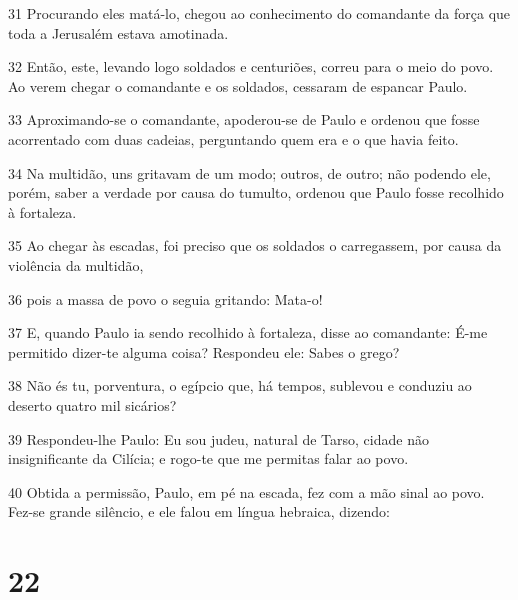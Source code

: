 \par 31 Procurando eles matá-lo, chegou ao conhecimento do comandante da força que toda a Jerusalém estava amotinada.
\par 32 Então, este, levando logo soldados e centuriões, correu para o meio do povo. Ao verem chegar o comandante e os soldados, cessaram de espancar Paulo.
\par 33 Aproximando-se o comandante, apoderou-se de Paulo e ordenou que fosse acorrentado com duas cadeias, perguntando quem era e o que havia feito.
\par 34 Na multidão, uns gritavam de um modo; outros, de outro; não podendo ele, porém, saber a verdade por causa do tumulto, ordenou que Paulo fosse recolhido à fortaleza.
\par 35 Ao chegar às escadas, foi preciso que os soldados o carregassem, por causa da violência da multidão,
\par 36 pois a massa de povo o seguia gritando: Mata-o!
\par 37 E, quando Paulo ia sendo recolhido à fortaleza, disse ao comandante: É-me permitido dizer-te alguma coisa? Respondeu ele: Sabes o grego?
\par 38 Não és tu, porventura, o egípcio que, há tempos, sublevou e conduziu ao deserto quatro mil sicários?
\par 39 Respondeu-lhe Paulo: Eu sou judeu, natural de Tarso, cidade não insignificante da Cilícia; e rogo-te que me permitas falar ao povo.
\par 40 Obtida a permissão, Paulo, em pé na escada, fez com a mão sinal ao povo. Fez-se grande silêncio, e ele falou em língua hebraica, dizendo:

\chapter{22}

